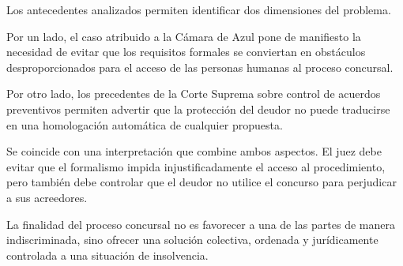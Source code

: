 \documentclass[12pt,oneside]{book}
\begin{document}
Los antecedentes analizados permiten identificar dos dimensiones del problema.

Por un lado, el caso atribuido a la Cámara de Azul pone de manifiesto la necesidad de evitar que los requisitos formales se conviertan en obstáculos desproporcionados para el acceso de las personas humanas al proceso concursal.

Por otro lado, los precedentes de la Corte Suprema sobre control de acuerdos preventivos permiten advertir que la protección del deudor no puede traducirse en una homologación automática de cualquier propuesta.

Se coincide con una interpretación que combine ambos aspectos. El juez debe evitar que el formalismo impida injustificadamente el acceso al procedimiento, pero también debe controlar que el deudor no utilice el concurso para perjudicar a sus acreedores.

La finalidad del proceso concursal no es favorecer a una de las partes de manera indiscriminada, sino ofrecer una solución colectiva, ordenada y jurídicamente controlada a una situación de insolvencia.
\end{document}
